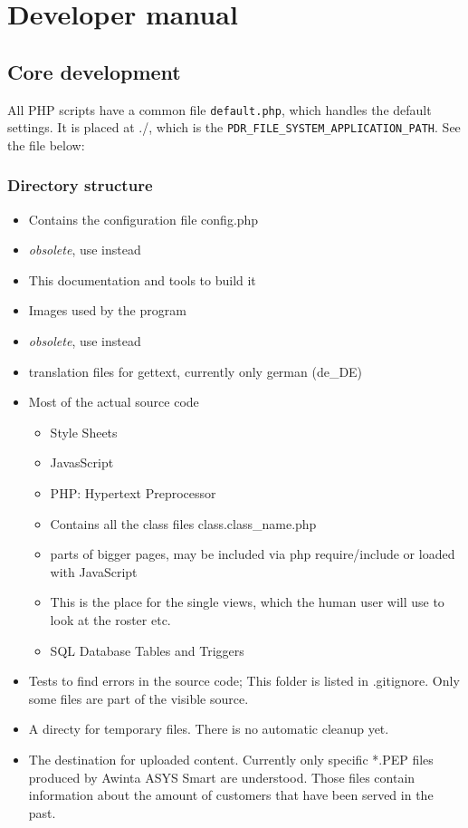 
\chapter{Developer manual}


\section{Core development}
All PHP scripts have a common file \texttt{default.php}, which handles the default settings. It is placed at ./, which is the \texttt{PDR\_FILE\_SYSTEM\_APPLICATION\_PATH}.
See the file below:


\subsection{Directory structure}
\begin{itemize}
\item {} Contains the configuration file config.php
\item {} \emph{obsolete}, use  instead
\item {} This documentation and tools to build it
\item {} Images used by the program
\item {}  \emph{obsolete}, use  instead
\item {} translation files for gettext, currently only german (de\_DE)
\item {} Most of the actual source code
    \begin{itemize}
    \item {} Style Sheets
    \item {} JavasScript
    \item {} PHP: Hypertext Preprocessor
    \item {} Contains all the class files class.class\_name.php
    \item {} parts of bigger pages, may be included via php require/include or loaded with JavaScript
    \item {} This is the place for the single views, which the human user will use to look at the roster etc.
    \item {} SQL Database Tables and Triggers
    \end{itemize}
\item {} Tests to find errors in the source code; This folder is listed in .gitignore. Only some files are part of the visible source.
\item {} A directy for temporary files. There is no automatic cleanup yet.
\item {} The destination for uploaded content. Currently only specific *.PEP files produced by Awinta ASYS Smart are understood. Those files contain information about the amount of customers that have been served in the past.
\end{itemize}

